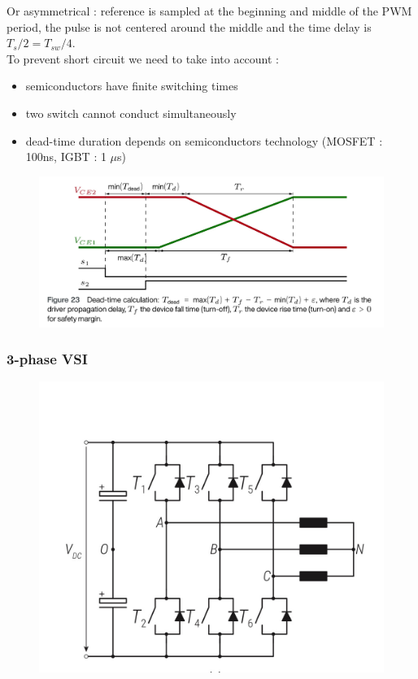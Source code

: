 \documentclass[../main.tex]{subfiles}
\begin{document}
Or asymmetrical : reference is sampled at the beginning and middle of the PWM period, the pulse is not centered around the middle and the time delay is $T_s/2 = T_{sw}/4$.\\

To prevent short circuit we need to take into account : \begin{itemize}
    \item semiconductors have finite switching times
    \item two switch cannot conduct simultaneously 
    \item dead-time duration depends on semiconductors technology (MOSFET : 100ns, IGBT : 1 $\mu$s)
\end{itemize}

\begin{figure}[hbt!]
    \centering
    \includegraphics[width=0.7\linewidth]{IMAGES/Indus_el/IMG_0184.jpeg}
\end{figure}
\subsubsection{3-phase VSI}

\begin{figure}[hbt!]
    \centering
    \includegraphics[width=0.7\linewidth]{IMAGES/Indus_el/IMG_0187.jpeg}
\end{figure}
\end{document}
